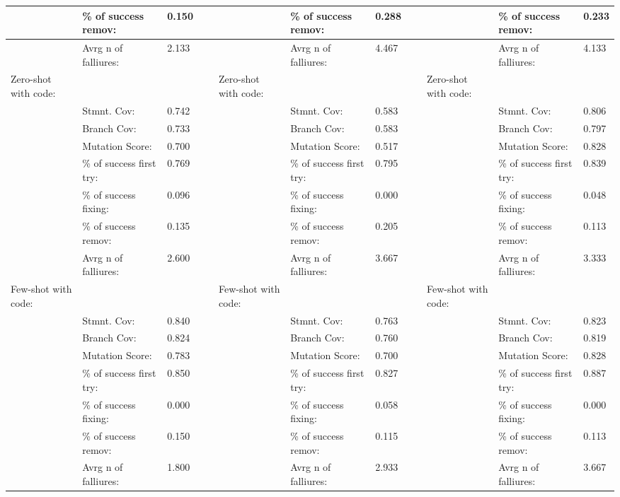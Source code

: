 \documentclass[a4paper,11pt,oneside]{memoir}
\begin{document}
\begin{table}[!ht]
{\begin{tabular}{|l|l|l|l|l|l|l|l|l|l|l|}
        ~ & \% of success remov: & 0.150 & ~ & ~ & \% of success remov: & 0.288 & ~ & ~ & \% of success remov: & 0.233 \\ \hline
        ~ & Avrg n of falliures: & 2.133 & ~ & ~ & Avrg n of falliures: & 4.467 & ~ & ~ & Avrg n of falliures: & 4.133 \\ \hline
        Zero-shot with code: & ~ & ~ & ~ & Zero-shot with code: & ~ & ~ & ~ & Zero-shot with code: & ~ & ~ \\ \hline
        ~ & Stmnt. Cov: & 0.742 & ~ & ~ & Stmnt. Cov: & 0.583 & ~ & ~ & Stmnt. Cov: & 0.806 \\ \hline
        ~ & Branch Cov: & 0.733 & ~ & ~ & Branch Cov: & 0.583 & ~ & ~ & Branch Cov: & 0.797 \\ \hline
        ~ & Mutation Score: & 0.700 & ~ & ~ & Mutation Score: & 0.517 & ~ & ~ & Mutation Score: & 0.828 \\ \hline
        ~ & \% of success first try: & 0.769 & ~ & ~ & \% of success first try: & 0.795 & ~ & ~ & \% of success first try: & 0.839 \\ \hline
        ~ & \% of success fixing: & 0.096 & ~ & ~ & \% of success fixing: & 0.000 & ~ & ~ & \% of success fixing: & 0.048 \\ \hline
        ~ & \% of success remov: & 0.135 & ~ & ~ & \% of success remov: & 0.205 & ~ & ~ & \% of success remov: & 0.113 \\ \hline
        ~ & Avrg n of falliures: & 2.600 & ~ & ~ & Avrg n of falliures: & 3.667 & ~ & ~ & Avrg n of falliures: & 3.333 \\ \hline
        Few-shot with code: & ~ & ~ & ~ & Few-shot with code: & ~ & ~ & ~ & Few-shot with code: & ~ & ~ \\ \hline
        ~ & Stmnt. Cov: & 0.840 & ~ & ~ & Stmnt. Cov: & 0.763 & ~ & ~ & Stmnt. Cov: & 0.823 \\ \hline
        ~ & Branch Cov: & 0.824 & ~ & ~ & Branch Cov: & 0.760 & ~ & ~ & Branch Cov: & 0.819 \\ \hline
        ~ & Mutation Score: & 0.783 & ~ & ~ & Mutation Score: & 0.700 & ~ & ~ & Mutation Score: & 0.828 \\ \hline
        ~ & \% of success first try: & 0.850 & ~ & ~ & \% of success first try: & 0.827 & ~ & ~ & \% of success first try: & 0.887 \\ \hline
        ~ & \% of success fixing: & 0.000 & ~ & ~ & \% of success fixing: & 0.058 & ~ & ~ & \% of success fixing: & 0.000 \\ \hline
        ~ & \% of success remov: & 0.150 & ~ & ~ & \% of success remov: & 0.115 & ~ & ~ & \% of success remov: & 0.113 \\ \hline
        ~ & Avrg n of falliures: & 1.800 & ~ & ~ & Avrg n of falliures: & 2.933 & ~ & ~ & Avrg n of falliures: & 3.667 \\ \hline
    \end{tabular}}
\end{table}
\end{document}
